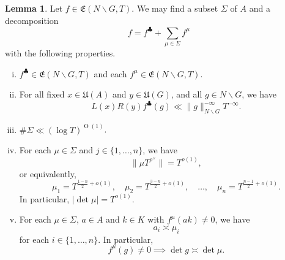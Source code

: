 \documentclass[reqno]{amsart}
\def\O{\operatorname{O}}
\theoremstyle{plain} \newtheorem{theorem} {Theorem}
\theoremstyle{definition} \newtheorem{definition} [theorem] {Definition}
\theoremstyle{itplain} %
\newtheorem{lemma}[theorem]{Lemma}
\numberwithin{equation}{section}
\numberwithin{theorem}{section}
\begin{document}
\begin{lemma}\label{lem:standard:let-f-in-2}
  Let $f \in \mathfrak{E}(N \backslash G, T)$.  We may find a subset $\Sigma$ of $A$ and a decomposition
  \begin{equation}\label{eq:f-=-fclubsuit}
    f = f^{\clubsuit} + \sum _{\mu \in \Sigma } f^{\mu}
  \end{equation}
  with the following properties.
  \begin{enumerate}[(i)]
  \item $f^{\clubsuit} \in \mathfrak{E}(N \backslash G, T)$ and each $f^{\mu} \in \mathfrak{E}(N \backslash G, T)$.
  \item \label{itm:standard:clubsuit-2} For all fixed $x \in \mathfrak{U}(A)$ and $y \in \mathfrak{U}(G)$, and all $g \in N \backslash G$, we have
    \begin{equation*}
      L(x) R(y) f ^{\clubsuit}(g) \ll \|g\|_{N \backslash G}^{-\infty} T^{-\infty}.
    \end{equation*}
  \item \label{itm:standard:decomposition-support-3} $\# \Sigma \ll (\log T)^{\O(1)}$.
  \item \label{itm:standard:decomposition-support-4} For each $\mu \in \Sigma$ and $j \in \{1, \dotsc, n\}$, we have
    \begin{equation*}
      \|\mu T^{\rho^\vee}\| = T^{o(1)},
    \end{equation*}
    or equivalently,
    \begin{equation}\label{eq:mu_1-=-tfrac1}
      \mu_1 = T^{\frac{1-n}{2} + o(1)}, \quad
      \mu_2 = T^{\frac{3-n}{2} + o(1)},
      \quad
      \dotsc,
      \quad
      \mu_n = T^{\frac{n-1}{2} + o(1)}.
    \end{equation}
    In particular, $|\det \mu| = T^{o(1)}$.
  \item \label{itm:standard:decomposition-support-5} For each $\mu \in \Sigma$, $a \in A$ and $k \in K$ with $f^{\mu}(a k) \neq 0$, we have
    \begin{equation*}
      a_i \asymp \mu_i
    \end{equation*}
    for each $i \in \{1, \dotsc, n\}$.  In particular,
    \begin{equation*}
      f^{\mu}(g) \neq 0 \implies \det g \asymp \det \mu.
    \end{equation*}
  \end{enumerate}
\end{lemma}
\end{document}
